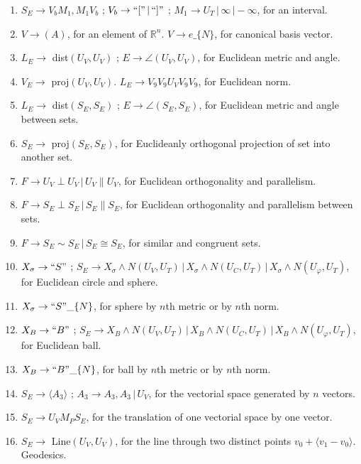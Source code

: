 \documentclass[11pt,a4paper]{article}
\newenvironment{myenum}
{ \begin{enumerate}
    \setlength{\itemsep}{0pt}
    \setlength{\parskip}{0pt}
    \setlength{\parsep}{0pt}     }
{ \end{enumerate}                  }
\begin{document}
\begin{myenum}
		$S_E \rightarrow H_S\wedge N$, for Euclidean orthogonal complement, border, set (field) of fractions, set (ring) of matrixes $N\times N$,	set $\cup\,\{\infty, -\infty\}$ and Cartesian product of $n$ copies of set.
		\item $S_E \rightarrow V_bM_1, M_1V_b$ ; $V_b \rightarrow ``["\,|\,``]"$ ; $M_1 \rightarrow U_T\,|\,\infty\,|-\infty$, for an interval.
		\item $V \rightarrow (A)$, for an element of $\mathbb{R}^n$. $V \rightarrow e\_\{N\}$, for canonical basis vector.
		\item $L_E \rightarrow$ dist$(U_V, U_V)$ ; $E \rightarrow \angle(U_V,U_V)$, for Euclidean metric and angle.
		\item $V_E \rightarrow$ proj$(U_V, U_V)$. $L_E \rightarrow V_9V_9U_VV_9V_9$, for Euclidean norm.
		\item $L_E \rightarrow$ dist$(S_E, S_E)$ ; $E \rightarrow \angle(S_E,S_E)$, for Euclidean metric and angle between sets.
		\item $S_E \rightarrow$ proj$(S_E, S_E)$, for Euclideanly orthogonal projection of set into another set.
		\item $F \rightarrow U_V \perp U_V\,|\,U_V \parallel U_V$, for Euclidean orthogonality and parallelism.
		\item $F \rightarrow S_E \perp S_E\,|\,S_E \parallel S_E$, for Euclidean orthogonality and parallelism between sets.
		\item $F \rightarrow S_E \sim S_E\,|\,S_E \cong S_E$, for similar and congruent sets.
		\item $X_\sigma \rightarrow ``S"$ ; $S_E \rightarrow X_\sigma\wedge N(U_V, U_T)\,|\,X_\sigma\wedge N(U_C, U_T)\,|\,X_\sigma\wedge N(U_\varphi, U_T)$, for Euclidean circle and sphere.
		\item $X_\sigma \rightarrow ``S"\_\{N\}$, for sphere by $n$th metric or by $n$th norm.
		\item $X_B \rightarrow ``B"$ ; $S_E \rightarrow X_B\wedge N(U_V, U_T)\,|\,X_B\wedge N(U_C, U_T)\,|\,X_B\wedge N(U_\varphi, U_T)$, for Euclidean ball.
		\item $X_B \rightarrow ``B"\_\{N\}$, for ball by $n$th metric or by $n$th norm.
		\item $S_E \rightarrow \langle A_3 \rangle$ ; $A_3 \rightarrow A_3, A_3\,|\,U_V$, for the vectorial space generated by $n$ vectors.
		\item $S_E \rightarrow U_V M_P S_E$, for the translation of one vectorial space by one vector.
		\item $S_E \rightarrow$ Line$(U_V, U_V)$, for the line through two distinct points $v_0 + \langle v_1 - v_0 \rangle$. Geodesics.

\end{myenum}
\end{document}
